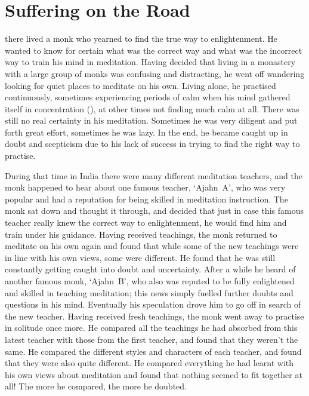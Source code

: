 
\chapter{Suffering on the Road}

 there lived a monk who yearned to find the true way to enlightenment.  He wanted to know for certain what was the correct way and what was the incorrect way to train his mind in meditation. Having decided that living in a monastery with a large group of monks was confusing and distracting, he went off wandering looking for quiet places to meditate on his own. Living alone, he practised continuously, sometimes experiencing periods of calm when his mind gathered itself in concentration (), at other times not finding much calm at all. There was still no real certainty in his meditation. Sometimes he was very diligent and put forth great effort, sometimes he was lazy. In the end, he became caught up in doubt and scepticism due to his lack of success in trying to find the right way to practise.

During that time in India there were many different meditation teachers, and the monk happened to hear about one famous teacher, `Ajahn~A', who was very popular and had a reputation for being skilled in meditation instruction. The monk sat down and thought it through, and decided that just in case this famous teacher really knew the correct way to enlightenment, he would find him and train under his guidance. Having received teachings, the monk returned to meditate on his own again and found that while some of the new teachings were in line with his own views, some were different. He found that he was still constantly getting caught into doubt and uncertainty. After a while he heard of another famous monk, `Ajahn~B', who also was reputed to be fully enlightened and skilled in teaching meditation; this news simply fuelled further doubts and questions in his mind. Eventually his speculation drove him to go off in search of the new teacher. Having received fresh teachings, the monk went away to practise in solitude once more. He compared all the teachings he had absorbed from this latest teacher with those from the first teacher, and found that they weren't the same. He compared the different styles and characters of each teacher, and found that they were also quite different. He compared everything he had learnt with his own views about meditation and found that nothing seemed to fit together at all! The more he compared, the more he doubted.

